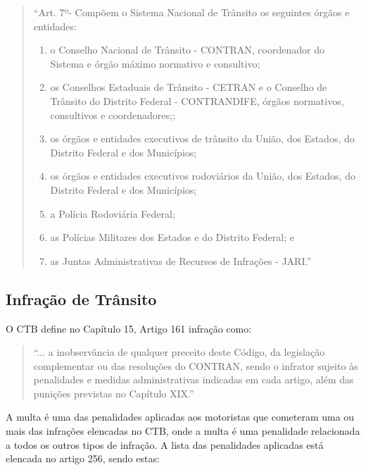         \begin{quote}
            ``Art. 7º- Compõem o Sistema Nacional de Trânsito os seguintes órgãos e entidades:

            \renewcommand{\theenumi}{\Roman{enumi}}%
                \begin{enumerate}
                    \item o Conselho Nacional de Trânsito - CONTRAN, coordenador do Sistema e órgão máximo normativo e consultivo;
                    \item os Conselhos Estaduais de Trânsito - CETRAN e o Conselho de Trânsito do Distrito Federal - CONTRANDIFE, órgãos normativos, consultivos e coordenadores;;
                    \item os órgãos e entidades executivos de trânsito da União, dos Estados, do Distrito Federal e dos Municípios;
                    \item os órgãos e entidades executivos rodoviários da União, dos Estados, do Distrito Federal e dos Municípios;
                    \item a Polícia Rodoviária Federal;
                    \item as Polícias Militares dos Estados e do Distrito Federal; e
                    \item as Juntas Administrativas de Recursos de Infrações - JARI.''
                 \end{enumerate}
         \end{quote}


\subsection{Infração de Trânsito}

    O CTB define no Capítulo 15, Artigo 161 infração como: 
    
         \begin{quote}
            ``{...} a inobservância de qualquer preceito deste Código, da legislação complementar ou das resoluções do CONTRAN, sendo o infrator sujeito às penalidades e medidas administrativas indicadas em cada artigo, além das punições previstas no Capítulo XIX.''
         \end{quote}
         
    A multa é uma das penalidades aplicadas aos motoristas que cometeram uma ou mais das infrações elencadas no CTB, onde a multa é uma penalidade relacionada a todos os outros tipos de infração. A lista das penalidades aplicadas está elencada no artigo 256, sendo estas:
    
